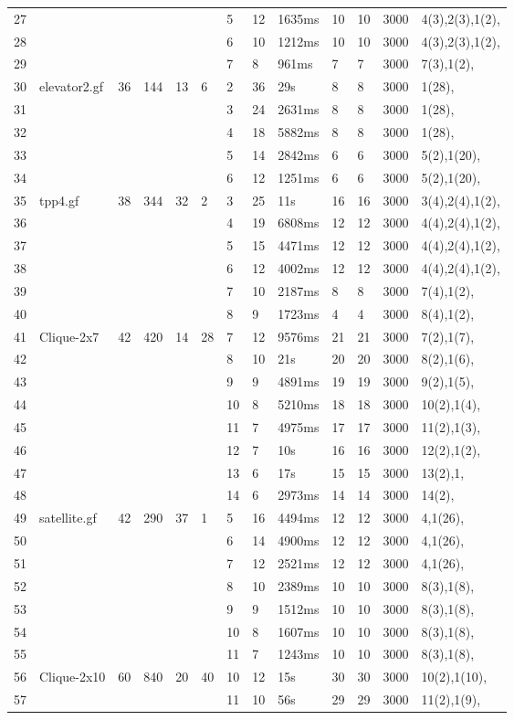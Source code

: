 \documentclass{article}
\begin{document}
\begin{longtable}{|l |l |l |l |l |l |l |l |l |l |l |l |l |}
27&&&&&&5&12&1635ms&10&10&3000&4(3),2(3),1(2),\\
28&&&&&&6&10&1212ms&10&10&3000&4(3),2(3),1(2),\\
29&&&&&&7&8&961ms&7&7&3000&7(3),1(2),\\
30&elevator2.gf&36&144&13&6&2&36&29s&8&8&3000&1(28),\\
31&&&&&&3&24&2631ms&8&8&3000&1(28),\\
32&&&&&&4&18&5882ms&8&8&3000&1(28),\\
33&&&&&&5&14&2842ms&6&6&3000&5(2),1(20),\\
34&&&&&&6&12&1251ms&6&6&3000&5(2),1(20),\\
35&tpp4.gf&38&344&32&2&3&25&11s&16&16&3000&3(4),2(4),1(2),\\
36&&&&&&4&19&6808ms&12&12&3000&4(4),2(4),1(2),\\
37&&&&&&5&15&4471ms&12&12&3000&4(4),2(4),1(2),\\
38&&&&&&6&12&4002ms&12&12&3000&4(4),2(4),1(2),\\
39&&&&&&7&10&2187ms&8&8&3000&7(4),1(2),\\
40&&&&&&8&9&1723ms&4&4&3000&8(4),1(2),\\
41&Clique-2x7&42&420&14&28&7&12&9576ms&21&21&3000&7(2),1(7),\\
42&&&&&&8&10&21s&20&20&3000&8(2),1(6),\\
43&&&&&&9&9&4891ms&19&19&3000&9(2),1(5),\\
44&&&&&&10&8&5210ms&18&18&3000&10(2),1(4),\\
45&&&&&&11&7&4975ms&17&17&3000&11(2),1(3),\\
46&&&&&&12&7&10s&16&16&3000&12(2),1(2),\\
47&&&&&&13&6&17s&15&15&3000&13(2),1,\\
48&&&&&&14&6&2973ms&14&14&3000&14(2),\\
49&satellite.gf&42&290&37&1&5&16&4494ms&12&12&3000&4,1(26),\\
50&&&&&&6&14&4900ms&12&12&3000&4,1(26),\\
51&&&&&&7&12&2521ms&12&12&3000&4,1(26),\\
52&&&&&&8&10&2389ms&10&10&3000&8(3),1(8),\\
53&&&&&&9&9&1512ms&10&10&3000&8(3),1(8),\\
54&&&&&&10&8&1607ms&10&10&3000&8(3),1(8),\\
55&&&&&&11&7&1243ms&10&10&3000&8(3),1(8),\\
56&Clique-2x10&60&840&20&40&10&12&15s&30&30&3000&10(2),1(10),\\
57&&&&&&11&10&56s&29&29&3000&11(2),1(9),\\

\end{longtable}
\end{document}
